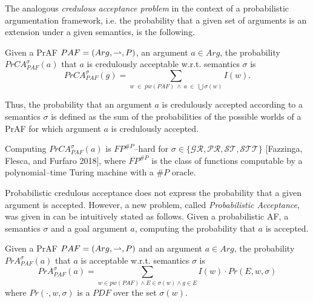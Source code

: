 The analogous {\color{teal} \textit{credulous acceptance problem}} in the context of a probabilistic argumentation framework, 
i.e. the probability that a given set of arguments is an extension under a given semantics, is the following.






\begin{df}
    Given a PrAF $PAF=(Arg,\rightharpoonup,P)$, 
    an argument $a \in Arg$, 
    the probability $PrCA^\sigma_{PAF}(a)$ that $a$ is credulously acceptable w.r.t. semantics $\sigma$ is 
    \[
        PrCA^\sigma_{PAF} (g)
            = 
        \sum_{w \;\in\; pw(PAF) ~\land~ a\; \in\; \bigcup \sigma(w)} I(w).
    \]
\end{df}


Thus, 
the probability that an argument $a$ is credulously accepted according to a semantics $\sigma$ is defined as the sum of the probabilities of the possible worlds  of a PrAF for which argument $a$ is credulously accepted.





Computing $PrCA^\sigma_{PAF}(a)$ is $FP^{\#P}$--hard for $\sigma \in \{\mathcal{GR,PR,ST},\mathcal{STT}\}$ [Fazzinga, Flesca, and Furfaro 2018], 
where $FP^{\#P}$ is the class of functions computable by a polynomial--time Turing machine with a $\#P$ oracle.





Probabilistic credulous acceptance does not express the probability that a given argument is accepted. 
% 
However, 
a new problem, called \textit{Probabilistic Acceptance}, 
was given in \cite{Alf.Cal.Gre.Par.Tru2020} can be intuitively stated as follows.
% 
Given a probabilistic AF, 
a semantics $\sigma$ and a goal argument $a$, 
computing the probability that $a$ is accepted. 



\begin{df}
    Given a PrAF $PAF=(Arg,\rightharpoonup,P)$ and an argument $a \in Arg$, 
    the probability $PrA^\sigma_{PAF}(a)$ that $a$ is acceptable w.r.t. semantics $\sigma$ is
    \[
        PrA^\sigma_{PAF}(a)
        =
        \sum_{w \in pw(PAF) \land E \in \sigma(w) \land g \in E} I(w) \cdot Pr(E,w,\sigma)
    \]
    where $Pr(\cdot,w,\sigma)$ is a $PDF$ over the set $\sigma(w)$.
\end{df}







